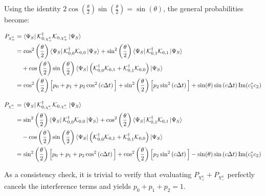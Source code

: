 \documentclass[a4paper,12pt]{article}
\begin{document}
Using the identity $ 2 \cos\left(\frac{\theta}{2}\right)\sin\left(\frac{\theta}{2}\right) = \sin(\theta) $, the general probabilities become:

\begin{align}
	P_{\chi_{+}^{a}} &= \bra{\Psi_{S}} \mathcal{K}_{0, \chi_{+}^{a}}^{\dagger} \mathcal{K}_{0, \chi_{+}^{a}} \ket{\Psi_{S}} \notag \\
	&= \cos^2 \left(\frac{\theta}{2}\right) \bra{\Psi_{S}} \mathcal{K}_{0,0}^\dagger \mathcal{K}_{0,0} \ket{\Psi_{S}} + \sin^2 \left(\frac{\theta}{2}\right) \bra{\Psi_{S}} \mathcal{K}_{0,1}^\dagger \mathcal{K}_{0,1} \ket{\Psi_{S}} \notag \\
	&\quad + \cos \left(\frac{\theta}{2}\right)\sin \left(\frac{\theta}{2}\right) \bra{\Psi_{S}} \left( \mathcal{K}_{0,0}^\dagger \mathcal{K}_{0,1} + \mathcal{K}_{0,1}^\dagger \mathcal{K}_{0,0} \right) \ket{\Psi_{S}} \notag \\
	&= \cos^2 \left(\frac{\theta}{2}\right) \Big[ p_{0} + p_{1} + p_{2} \cos^2 \left( c \Delta t \right) \Big] + \sin^2 \left(\frac{\theta}{2}\right) \Big[ p_{2} \sin^2 \left( c \Delta t \right) \Big] + \sin(\theta)\sin \left( c \Delta t \right) \text{Im}(c_1^* c_2)
\end{align}

\begin{align}
	P_{\chi_{-}^{a}} &= \bra{\Psi_{S}} \mathcal{K}_{0, \chi_{-}^{a}}^{\dagger} \mathcal{K}_{0, \chi_{-}^{a}} \ket{\Psi_{S}} \notag \\
	&= \sin^2 \left(\frac{\theta}{2}\right) \bra{\Psi_{S}} \mathcal{K}_{0,0}^\dagger \mathcal{K}_{0,0} \ket{\Psi_{S}} + \cos^2 \left(\frac{\theta}{2}\right) \bra{\Psi_{S}} \mathcal{K}_{0,1}^\dagger \mathcal{K}_{0,1} \ket{\Psi_{S}} \notag \\
	&\quad - \cos \left(\frac{\theta}{2}\right)\sin \left(\frac{\theta}{2}\right) \bra{\Psi_{S}} \left( \mathcal{K}_{0,0}^\dagger \mathcal{K}_{0,1} + \mathcal{K}_{0,1}^\dagger \mathcal{K}_{0,0} \right) \ket{\Psi_{S}} \notag \\
	&= \sin^2 \left(\frac{\theta}{2}\right) \Big[ p_{0} + p_{1} + p_{2} \cos^2 \left( c \Delta t \right) \Big] + \cos^2 \left(\frac{\theta}{2}\right) \Big[ p_{2} \sin^2 \left( c \Delta t \right) \Big] - \sin(\theta)\sin \left( c \Delta t \right) \text{Im}(c_1^* c_2)
\end{align}

As a consistency check, it is trivial to verify that evaluating $ P_{\chi_{+}^{a}} + P_{\chi_{-}^{a}} $ perfectly cancels the interference terms and yields $ p_0 + p_1 + p_2 = 1 $.
\end{document}
